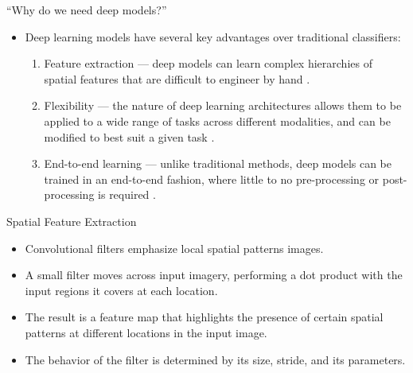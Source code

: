 \documentclass[aspectratio=169, hideallsubsectionså]{beamer}
\begin{document}
\begin{frame}{``Why do we need deep models?''}
    \begin{itemize}
        \item<1-> Deep learning models have several key advantages over traditional classifiers:
        \begin{enumerate}
            \item<2-> \alert{Feature extraction} --- deep models can learn complex hierarchies of \alert{spatial} features that are difficult to engineer by hand \cite{joginFeatureExtractionUsing2018}.
            \item<3-> \alert{Flexibility} --- the nature of deep learning architectures allows them to be applied to a wide range of tasks across different modalities, and can be modified to best suit a given task \cite{hongMoreDiverseMeans2021}.
            \item<4-> \alert{End-to-end learning} --- unlike traditional methods, deep models can be trained in an end-to-end fashion, where little to no pre-processing or post-processing is required \cite{hossainSegmentationObjectBasedImage2019,kotaridisRemoteSensingImage2021,neupaneDeepLearningBasedSemantic2021,zangLandUseMappingHighSpatial2021}.
        \end{enumerate}
    \end{itemize}
\end{frame}

\begin{frame}{Spatial Feature Extraction}
    \begin{itemize}
        \item<1-> Convolutional filters emphasize local spatial patterns images.
        \item<2-> A small filter moves across input imagery, performing a dot product with the input regions it covers at each location.
        \item<3-> The result is a \alert{feature map} that highlights the presence of certain spatial patterns at different locations in the input image.
        \item<4-> The behavior of the filter is determined by its size, stride, and its parameters.
    \end{itemize}
\end{frame}
\end{document}
